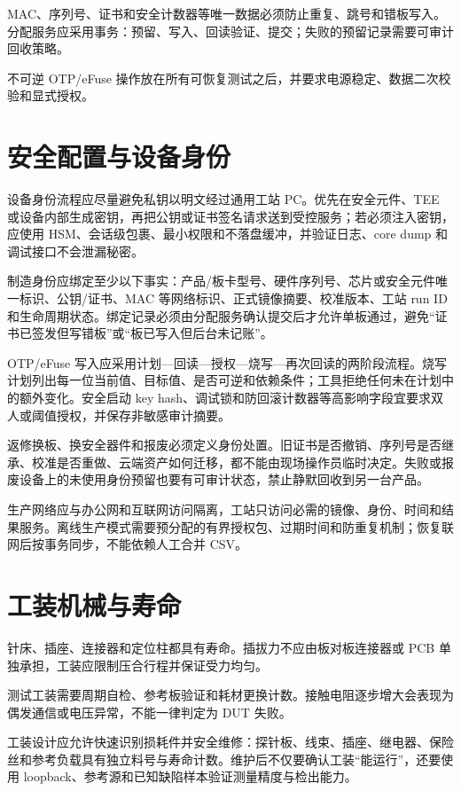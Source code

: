 MAC、序列号、证书和安全计数器等唯一数据必须防止重复、跳号和错板写入。分配服务应采用事务：预留、写入、回读验证、提交；失败的预留记录需要可审计回收策略。

不可逆 OTP/eFuse 操作放在所有可恢复测试之后，并要求电源稳定、数据二次校验和显式授权。

\section{安全配置与设备身份}

设备身份流程应尽量避免私钥以明文经过通用工站 PC。优先在安全元件、TEE 或设备内部生成密钥，再把公钥或证书签名请求送到受控服务；若必须注入密钥，应使用 HSM、会话级包裹、最小权限和不落盘缓冲，并验证日志、core dump 和调试接口不会泄漏秘密。

制造身份应绑定至少以下事实：产品/板卡型号、硬件序列号、芯片或安全元件唯一标识、公钥/证书、MAC 等网络标识、正式镜像摘要、校准版本、工站 run ID 和生命周期状态。绑定记录必须由分配服务确认提交后才允许单板通过，避免“证书已签发但写错板”或“板已写入但后台未记账”。

OTP/eFuse 写入应采用计划---回读---授权---烧写---再次回读的两阶段流程。烧写计划列出每一位当前值、目标值、是否可逆和依赖条件；工具拒绝任何未在计划中的额外变化。安全启动 key hash、调试锁和防回滚计数器等高影响字段宜要求双人或阈值授权，并保存非敏感审计摘要。

返修换板、换安全器件和报废必须定义身份处置。旧证书是否撤销、序列号是否继承、校准是否重做、云端资产如何迁移，都不能由现场操作员临时决定。失败或报废设备上的未使用身份预留也要有可审计状态，禁止静默回收到另一台产品。

生产网络应与办公网和互联网访问隔离，工站只访问必需的镜像、身份、时间和结果服务。离线生产模式需要预分配的有界授权包、过期时间和防重复机制；恢复联网后按事务同步，不能依赖人工合并 CSV。

\section{工装机械与寿命}

针床、插座、连接器和定位柱都具有寿命。插拔力不应由板对板连接器或 PCB 单独承担，工装应限制压合行程并保证受力均匀。

测试工装需要周期自检、参考板验证和耗材更换计数。接触电阻逐步增大会表现为偶发通信或电压异常，不能一律判定为 DUT 失败。

工装设计应允许快速识别损耗件并安全维修：探针板、线束、插座、继电器、保险丝和参考负载具有独立料号与寿命计数。维护后不仅要确认工装“能运行”，还要使用 loopback、参考源和已知缺陷样本验证测量精度与检出能力。

